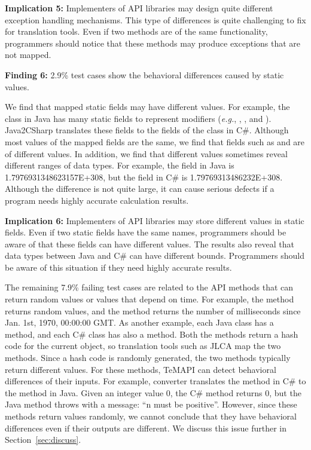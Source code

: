 \textbf{Implication 5:} Implementers of API libraries may design quite different exception handling mechanisms. This type of differences is quite challenging to fix for translation tools. Even if two methods are of the same functionality, programmers should notice that these methods may produce exceptions that are not mapped.

\textbf{Finding 6:} 2.9\% test cases show the behavioral differences caused by static values.

We find that mapped static fields may have different values. For example, the  class in Java has many static fields to represent modifiers (\emph{e.g.}, , , and ). Java2CSharp translates these fields to the fields of the  class in C\#. Although most values of the mapped fields are the same, we find that fields such as  and  are of different values. In addition, we find that different values sometimes reveal different ranges of data types. For example, the  field in Java is 1.7976931348623157E+308, but the  field in C\# is 1.79769313486232E+308.  Although the difference is not quite large, it can cause serious defects if a program needs highly accurate calculation results.

\textbf{Implication 6:} Implementers of API libraries may store different values in static fields. Even if two static fields have the same names, programmers should be aware of that these fields can have different values. The results also reveal that data types between Java and C\# can have different bounds. Programmers should be aware of this situation if they need highly accurate results.

The remaining 7.9\% failing test cases are related to the API methods that can return random values or values that depend on time. For example, the  method returns random values, and the  method returns the number of milliseconds since Jan. 1st, 1970, 00:00:00 GMT. As another example, each Java class has a  method, and each C\# class has also a  method. Both the methods return a hash code for the current object, so translation tools such as JLCA map the two methods. Since a hash code is randomly generated, the two methods typically return different values. For these methods, TeMAPI can detect behavioral differences of their inputs. For example, converter translates the  method in C\# to the  method in Java. Given an integer value 0, the C\# method returns 0, but the Java method throws  with a message: ``n must be positive''. However, since these methods return values randomly, we cannot conclude that they have behavioral differences even if their outputs are different. We discuss this issue further in Section~\ref{sec:discuss}.

